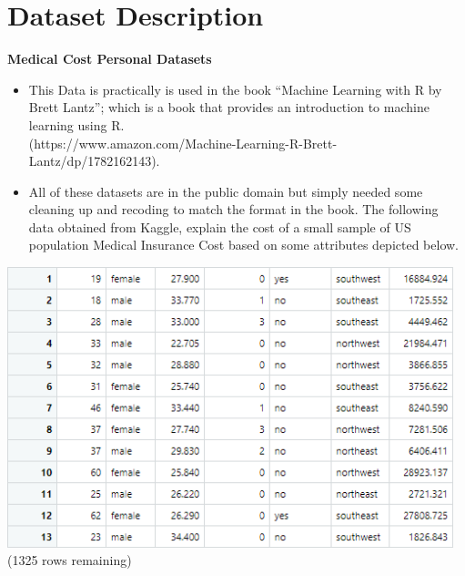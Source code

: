\documentclass[a4paper]{article}
\begin{document}
\newpage
\renewcommand*\contentsname{Contents}
\tableofcontents
\newpage
{}

\lstset{style=mystyle}



\section{Dataset Description}
{\Large \textbf{Medical Cost Personal Datasets}}
\begin{itemize}
    \item This Data is practically is used in the book “Machine Learning with R by Brett Lantz”; which is a book that provides an introduction to machine learning using R.\\ ({\color{blue}https://www.amazon.com/Machine-Learning-R-Brett-Lantz/dp/1782162143}).
    \item All of these datasets are in the public domain but simply needed some cleaning up and recoding to match the format in the book. The following data obtained from Kaggle, explain the cost of a small sample of US population Medical Insurance Cost based on some attributes depicted below.
\end{itemize}
\begin{center} \includegraphics[width=13cm]{img/dataset.png} \\ (1325 rows remaining)\end{center}
\end{document}
